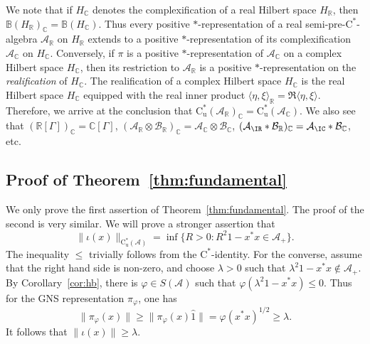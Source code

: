 \documentclass[12pt]{amsart}
\theoremstyle{definition}
\begin{document}
We note that if ${H}_{{\mathbb C}}$ denotes the complexification of
a real Hilbert space ${H}_{{\mathbb R}}$, then
${{\mathbb B}}({H}_{{\mathbb R}})_{{\mathbb C}}={{\mathbb B}}({H}_{{\mathbb C}})$.
Thus every positive {$*$-repre\-sen\-ta\-tion\xspace} of a real
{semi-pre-$\mathrm{C}^*$-alge\-bra\xspace} ${{\mathcal A}}_{{\mathbb R}}$ on ${H}_{{\mathbb R}}$ extends
to a positive {$*$-repre\-sen\-ta\-tion\xspace} of its complexification ${{\mathcal A}}_{{\mathbb C}}$
on ${H}_{{\mathbb C}}$.
Conversely, if $\pi$ is a positive {$*$-repre\-sen\-ta\-tion\xspace} of ${{\mathcal A}}_{{\mathbb C}}$
on a complex Hilbert space ${H}_{{\mathbb C}}$, then its restriction to ${{\mathcal A}}_{{\mathbb R}}$
is a positive {$*$-repre\-sen\-ta\-tion\xspace} on the \emph{realification} of ${H}_{{\mathbb C}}$.
The realification of a complex Hilbert space ${H}_{{\mathbb C}}$ is the real Hilbert
space ${H}_{{\mathbb C}}$ equipped with the real inner product
${\mathopen{\langle}{\eta,\xi}\mathclose{\rangle}}_{{\mathbb R}}=\Re{\mathopen{\langle}{\eta,\xi}\mathclose{\rangle}}$.
Therefore, we arrive at the conclusion that
$\mathrm{C}^*_{\mathrm{u}}({{\mathcal A}}_{{\mathbb R}})_{{\mathbb C}}=\mathrm{C}^*_{\mathrm{u}}({{\mathcal A}}_{{\mathbb C}})$.
We also see that $({{\mathbb R}}[{\Gamma}])_{{\mathbb C}}={{\mathbb C}}[{\Gamma}]$,
$({{\mathcal A}}_{{\mathbb R}}\otimes {{\mathcal B}}_{{\mathbb R}})_{{\mathbb C}}={{\mathcal A}}_{{\mathbb C}}\otimes {{\mathcal B}}_{{\mathbb C}}$,
$({{\mathcal A}}_\IR* {{\mathcal B}}_{{\mathbb R}})_{{\mathbb C}}={{\mathcal A}}_\IC* {{\mathcal B}}_{{\mathbb C}}$, etc.

\subsection{Proof of Theorem~\ref{thm:fundamental}}
We only prove the first assertion of Theorem~\ref{thm:fundamental}.
The proof of the second is very similar.
We will prove a stronger assertion that
\[
\|\iota(x)\|_{\mathrm{C}^*_{\mathrm{u}}({{\mathcal A}})}=\inf\{ R>0 : R^2 1 - x^*x \in{{\mathcal A}}_+\}.
\]
The inequality $\le$ trivially follows from the $\mathrm{C}^*$-identity.
For the converse, assume that the right hand side is non-zero, and
choose $\lambda>0$ such that $\lambda^2 1 - x^*x\notin {{\mathcal A}}_+$.
By Corollary~\ref{cor:hb}, there is ${\varphi}\in S({{\mathcal A}})$
such that ${\varphi}(\lambda^2 1-x^*x)\le0$.
Thus for the GNS representation $\pi_{\varphi}$, one has
\[
\|\pi_{\varphi}(x)\|\geq\|\pi_{\varphi}(x)\hat{1}\|={\varphi}(x^*x)^{1/2}\geq\lambda.
\]
It follows that $\|\iota(x)\|\geq\lambda$.
\hspace*{\fill}\qedsymbol
\end{document}
